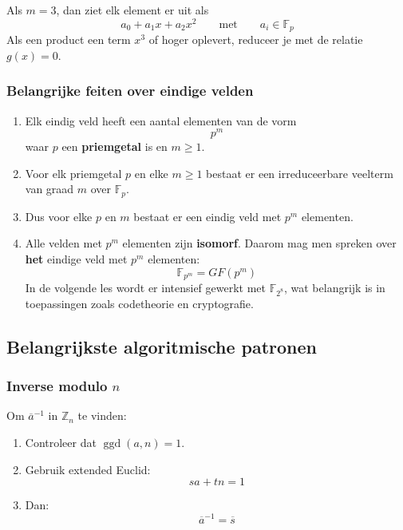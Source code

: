 \textbf{}\newline
Als $m=3$, dan ziet elk element er uit als
\begin{equation*}
    a_0 + a_1x + a_2x^2 \qquad \text{met} \qquad a_i \in \mathbb{F}_p
\end{equation*}
Als een product een term $x^3$ of hoger oplevert, reduceer je met de relatie $g(x) = 0$.

\subsubsection{Belangrijke feiten over eindige velden}

\begin{enumerate}
    \item Elk eindig veld heeft een aantal elementen van de vorm
    \begin{equation*}
        p^m
    \end{equation*}
    waar $p$ een \textbf{priemgetal} is en $m \ge 1$.
    \item Voor elk priemgetal $p$ en elke $m \ge 1$ bestaat er een irreduceerbare veelterm van graad $m$ over $\mathbb{F}_p$.
    \item Dus voor elke $p$ en $m$ bestaat er een eindig veld met $p^m$ elementen.
    \item Alle velden met $p^m$ elementen zijn \textbf{isomorf}. Daarom mag men spreken over \textbf{het} eindige veld met $p^m$ elementen:
    \begin{equation*}
        \mathbb{F}_{p^m} = GF(p^m)
    \end{equation*}
    In de volgende les wordt er intensief gewerkt met $\mathbb{F}_{2^8}$, wat belangrijk is in toepassingen zoals codetheorie en cryptografie.
\end{enumerate}

\subsection{Belangrijkste algoritmische patronen}

\subsubsection{Inverse modulo \texorpdfstring{$n$}{n}}

Om $\overline{a}^{-1}$ in $\mathbb{Z}_n$ te vinden:
\begin{enumerate}
    \item Controleer dat $\operatorname{ggd}(a,n) = 1$.
    \item Gebruik extended Euclid:
    \begin{equation*}
        sa + tn = 1
    \end{equation*}
    \item Dan:
    \begin{equation*}
        \overline{a}^{-1} = \overline{s}
    \end{equation*}
\end{enumerate}

